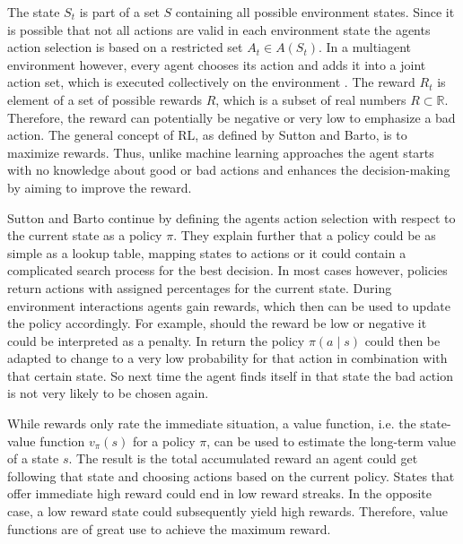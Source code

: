The state $S_t$ is part of a set $S$ containing all possible environment states. Since it is possible that not all actions are valid in each environment state the agents action selection is based on a restricted set $A_t\in A(S_t)$. In a multiagent environment however, every agent chooses its action and adds it into a joint action set, which is executed collectively on the environment \cite{buba10}. The reward $R_t$ is element of a set of possible rewards $R$, which is a subset of real numbers $R \subset \mathbb{R}$. Therefore, the reward can potentially be negative or very low to emphasize a bad action. The general concept of RL, as defined by Sutton and Barto, is to maximize rewards. Thus, unlike machine learning approaches the agent starts with no knowledge about good or bad actions and enhances the decision-making by aiming to improve the reward.

Sutton and Barto continue by defining the agents action selection with respect to the current state as a policy $\pi$. They explain further that a policy could be as simple as a lookup table, mapping states to actions or it could contain a complicated search process for the best decision.
In most cases however, policies return actions with assigned percentages for the current state.
During environment interactions agents gain rewards, which then can be used to update the policy accordingly. For example, should the reward be low or negative it could be interpreted as a penalty. In return the policy $\pi(a \mid s)$ could then be adapted to change to a very low probability for that action in combination with that certain state. So next time the agent finds itself in that state the bad action is not very likely to be chosen again.

While rewards only rate the immediate situation, a value function, i.e. the state-value function $v_{\pi}(s)$ for a policy $\pi$, can be used to estimate the long-term value of a state $s$. The result is the total accumulated reward an agent could get following that state and choosing actions based on the current policy. States that offer immediate high reward could end in
low reward streaks. In the opposite case, a low reward state could subsequently yield high rewards. Therefore, value functions are of great use to achieve the maximum reward.

